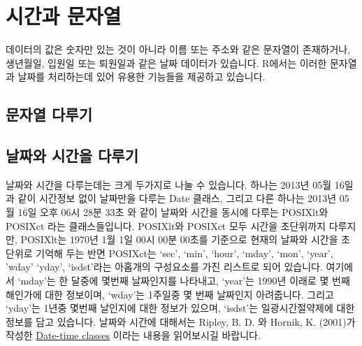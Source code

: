 %
%
%
%
%

\chapter{시간과 문자열}

데이터의 값은 숫자만 있는 것이 아니라 이름 또는 주소와 같은 문자열이 존재하거나, 생년월일, 입원일 또는 퇴원일과 같은 날짜 데이터가 있습니다.
R에서는 이러한 문자열과 날짜를 처리하는데 있어 유용한 기능들을 제공하고 있습니다.

\section{문자열 다루기}



\section{날짜와 시간을 다루기}

날짜와 시간을 다루는데는 크게 두가지로 나눌 수 있습니다.
하나는 2013년 05월 16일과 같이 시간정보 없이 날짜만을 다루는 Date 클래스, 그리고 다른 하나는 2013년 05월 16일 오후 06시 28분 33초 와 같이 날짜와 시간을 동시에 다루는 POSIXlt와 POSIXct 라는 클래스들입니다.
POSIXlt와 POSIXct 모두 시간을 초단위까지 다루지만, POSIXlt는 1970년 1월 1일 00시 00분 00초를 기준으로 현재의 날짜와 시간을 초단위로 기억해 두는 반면 POSIXct는 `sec', `min', `hour', `mday', `mon', `year', 'wday' `yday', `isdst'라는 아홉개의 구성요소를 가진 리스트로 되어 있습니다. 
여기에서 `mday'는 한 달중에 몇번째 날짜인지를 나타내고, `year'는 1990년 이래로 몇 번째 해인가에 대한 정보이며, `wday'는 1주일중 몇 번째 날짜인지 아려줍니다. 
그리고 `yday'는 1년중 몇번째 날인지에 대한 정보가 있으며, `isdst'는 일광시간절약제에 대한 정보를 담고 있습니다.
날짜와 시간에 대해서는 Ripley, B. D. 와 Hornik, K. (2001)가 작성한  \href{http://www.r-project.org/doc/Rnews/Rnews_2001-2.pdf}{Date-time classes} 이라는 내용을 읽어보시길 바랍니다. 



